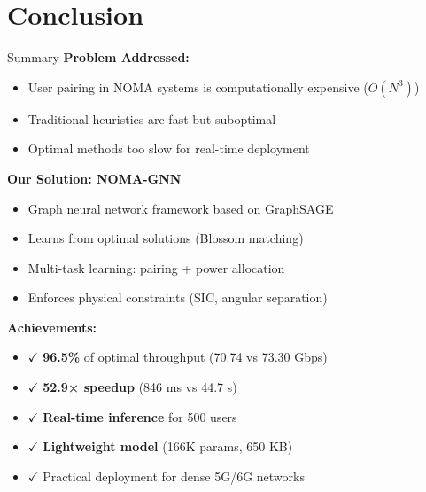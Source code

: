 \documentclass[aspectratio=169]{beamer}
\begin{document}
\section{Conclusion}

\begin{frame}{Summary}
    \textbf{Problem Addressed:}
    \begin{itemize}
        \item User pairing in NOMA systems is computationally expensive ($O(N^3)$)
        \item Traditional heuristics are fast but suboptimal
        \item Optimal methods too slow for real-time deployment
    \end{itemize}
    
    \vspace{0.3cm}
    
    \textbf{Our Solution: NOMA-GNN}
    \begin{itemize}
        \item Graph neural network framework based on GraphSAGE
        \item Learns from optimal solutions (Blossom matching)
        \item Multi-task learning: pairing + power allocation
        \item Enforces physical constraints (SIC, angular separation)
    \end{itemize}
    
    \vspace{0.3cm}
    
    \textbf{Achievements:}
    \begin{itemize}
        \item $\checkmark$ \textbf{96.5\%} of optimal throughput (70.74 vs 73.30 Gbps)
        \item $\checkmark$ \textbf{52.9× speedup} (846 ms vs 44.7 s)
        \item $\checkmark$ \textbf{Real-time inference} for 500 users
        \item $\checkmark$ \textbf{Lightweight model} (166K params, 650 KB)
        \item $\checkmark$ Practical deployment for dense 5G/6G networks
    \end{itemize}
\end{frame}
\end{document}

